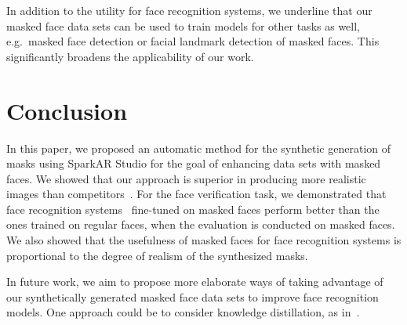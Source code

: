 \documentclass{article}
\begin{document}
In addition to the utility for face recognition systems, we underline that our masked face data sets can be used to train models for other tasks as well, e.g.~masked face detection or facial landmark detection of masked faces. This significantly broadens the applicability of our work.

\section{Conclusion}

In this paper, we proposed an automatic method for the synthetic generation of masks using SparkAR Studio for the goal of enhancing data sets with masked faces. 
We showed that our approach is superior in producing more realistic images than competitors~\cite{wang2020arxiv, anwar2020arxiv, huang2021icassp}. For the face verification task, we demonstrated that face recognition systems~\cite{Schroff15CVPR,Deng19CVPR,Parkhi15BMVC} fine-tuned on masked faces perform better than the ones trained on regular faces, when the evaluation is conducted on masked faces. We also showed that the usefulness of masked faces for face recognition systems is proportional to the degree of realism of the synthesized masks.

In future work, we aim to propose more elaborate ways of taking advantage of our synthetically generated masked face data sets to improve face recognition models. One approach could be to consider knowledge distillation, as in~\cite{Georgescu-ICPR-2020}.
 




\end{document}
